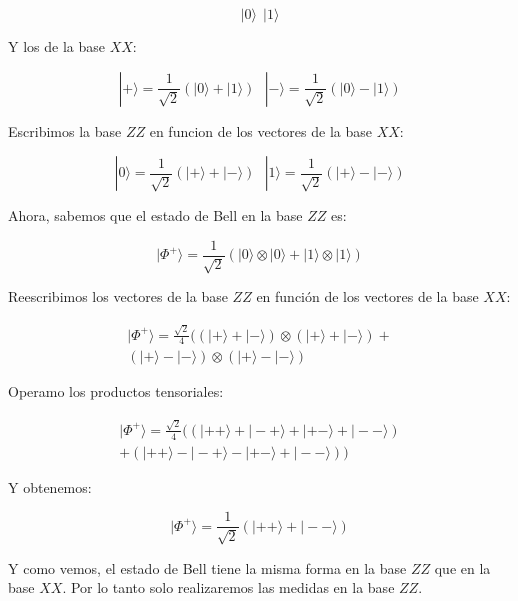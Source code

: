 \documentclass[11pt, a4paper, twocolumn]{article}
\begin{document}
\begin{equation}
	|0\rangle \:\: |1\rangle
\end{equation}

Y los de la base $XX$:

\begin{equation}
	|+\rangle = \frac{1}{\sqrt{2}}(|0\rangle+|1\rangle) \:\:\:
	|-\rangle = \frac{1}{\sqrt{2}}(|0\rangle-|1\rangle)  
\end{equation}

Escribimos la base $ZZ$ en funcion de los vectores de la base $XX$:

\begin{equation}
	|0\rangle = \frac{1}{\sqrt{2}}(|+\rangle+|-\rangle) \:\:\:
	|1\rangle = \frac{1}{\sqrt{2}}(|+\rangle-|-\rangle) 
\end{equation}

Ahora, sabemos que el estado de Bell en la base $ZZ$ es: 

\begin{equation}
	|\Phi^+\rangle = \frac{1}{\sqrt{2}}(|0\rangle \otimes |0\rangle + |1\rangle \otimes |1\rangle)
\end{equation}

Reescribimos los vectores de la base $ZZ$ en función de los vectores
de la base $XX$:

\begin{multline}
	|\Phi^+\rangle = \frac{\sqrt{2}}{4}((|+\rangle+|-\rangle) \otimes (|+\rangle+|-\rangle) + \\
	(|+\rangle-|-\rangle) \otimes (|+\rangle-|-\rangle)
\end{multline}

Operamo los productos tensoriales:

\begin{multline}
	|\Phi^+\rangle = \frac{\sqrt{2}}{4}((|++\rangle + |-+\rangle + |+-\rangle + |--\rangle)\\
	+ (|++\rangle - |-+\rangle - |+-\rangle + |--\rangle))
\end{multline}

Y obtenemos:

\begin{equation}
	|\Phi^+\rangle = \frac{1}{\sqrt{2}}(|++\rangle + |--\rangle)
\end{equation}

Y como vemos, el estado de Bell tiene la misma forma en la base $ZZ$ que en la base $XX$.
Por lo tanto solo realizaremos las medidas en la base $ZZ$.

\vspace{0.2cm}
\end{document}
